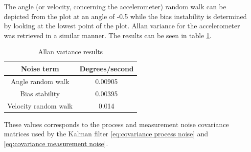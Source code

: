 \documentclass[a4paper,11pt]{kth-mag}
\begin{document}
The angle (or velocity, concerning the accelerometer) random walk can be depicted from the plot at an angle of -0.5 while the bias instability is determined by looking at the lowest point of the plot. Allan variance for the accelerometer was retrieved in a similar manner.  The results can be seen in table \ref{Table: Allan variance}.

\begin{table} [!hbt]
\centering
\begin{tabular}{@{}cc@{}} \toprule
Noise term & Degrees/second\\ \midrule
Angle random walk  	 & 0.00905\\
Bias stability   & 0.00395\\
Velocity random walk  	 & 0.014\\
\bottomrule
 \end{tabular}
 \caption{Allan variance results }
  \label{Table: Allan variance}
\end{table}




These values corresponds to the process and measurement noise covariance matrices used by the Kalman filter \ref{eq:covariance process noise} and \ref{eq:covariance measurement noise}.



%
%
\end{document}
